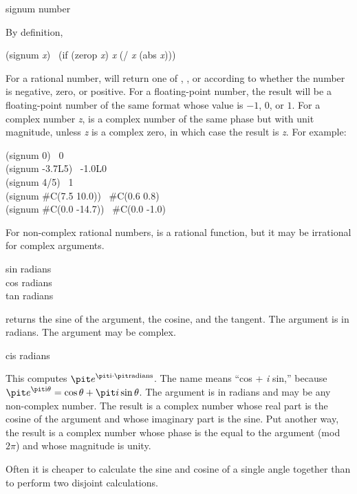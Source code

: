 \begin{defun}[Function]
signum number

By definition,
\begin{lisp}
(signum {\it x}) \EQ\ (if (zerop {\it x}) {\it x} (/ {\it x} (abs {\it x})))
\end{lisp}
For a rational number,  will return one of , , or 
according to whether the number is negative, zero, or positive.
For a floating-point number, the result will be a floating-point number
of the same format whose value is $-1$, $0$, or $1$.
For a complex number {\it z},  is a complex number of
the same phase but with unit magnitude, unless {\it z} is a complex zero,
in which case the result is {\it z}.
For example:
\begin{lisp}
(signum 0) \EV\ 0 \\
(signum -3.7L5) \EV\ -1.0L0 \\
(signum 4/5) \EV\ 1 \\
(signum \#C(7.5 10.0)) \EV\ \#C(0.6 0.8) \\
(signum \#C(0.0 -14.7)) \EV\ \#C(0.0 -1.0)
\end{lisp}
For non-complex rational numbers,  is a rational function,
but it may be irrational for complex arguments.
\end{defun}

\begin{defun}[Function]
sin radians \\
cos radians \\
tan radians

 returns the sine of the argument,  the cosine,
and  the tangent.  The argument is in radians.
The argument may be complex.
\end{defun}

\begin{defun}[Function]
cis radians

This computes \( {\it e} ^ {\hbox{\scriptsize\it i} \cdot \hbox{\scriptsize\it radians}} \).
The name  means ``cos + {\it i} sin,'' because
\( {\it e} ^{ \hbox{\scriptsize\it i} \theta } = \cos \theta + {\it i} \sin \theta \).
The argument is in
radians and may be any non-complex number.  The result is a complex
number whose real part is the cosine of the argument and whose imaginary
part is the sine.  Put another way, the result is a complex number whose
phase is the equal to the argument (mod $2\pi$)
and whose magnitude is unity.

\beforenoterule
\begin{implementation}
Often it is cheaper to calculate the sine and cosine
of a single angle together than to perform two disjoint calculations.
\end{implementation}
\afternoterule
\end{defun}

